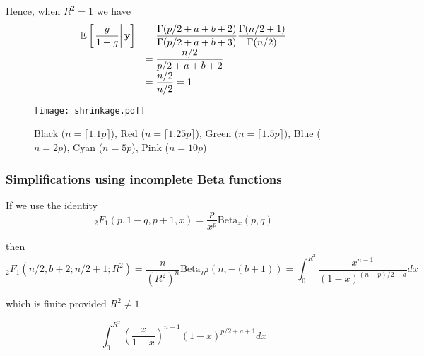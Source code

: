 \documentclass{article}
\def\vectorfontone{\bf}
\def\vy{{\vectorfontone y}}                      %
\def\bE{{\mathbb E}}                             %
\def\ds{\displaystyle}
\theoremstyle{definition}
\begin{document}
\noindent Hence, when $R^2=1$ we have
$$
\begin{array}{rl}
\ds \bE\left[ \left. \frac{g}{1+g}  \right| \vy \right]
& \ds = 
\frac{\Gamma(p/2+a+b+2)}{\Gamma(p/2+a+b+3)}    
\frac{\Gamma(n/2+1)}{\Gamma(n/2)}
\\
& \ds = \frac{ n/2}{p/2+a+b+2}
\\
& \ds = \frac{ n/2}{n/2} = 1
\end{array}
$$


\begin{figure}[ht]
	\centering
	\texttt{[image: shrinkage.pdf]}
	\caption{Black ($n=\lceil 1.1p \rceil$), Red ($n=\lceil 1.25p \rceil$), Green ($n=\lceil 1.5p \rceil$), Blue ($n= 2p$), Cyan ($n= 5p$), Pink ($n= 10p$)}
	\label{fig:04}
\end{figure}



 








\subsubsection{Simplifications using incomplete Beta functions}

If we use the identity
$$
{}_2 F_1(p,1-q,p+1,x) = \frac{p}{x^p}\mbox{Beta}_x(p,q)
$$

\noindent then
$$
{}_2 F_1(n/2,b+2;n/2 + 1;R^2) = \frac{n}{(R^2)^n}\mbox{Beta}_{R^2}(n,-(b+1)) = \int_{0}^{R^2} \frac{ x^{n-1}}{ (1-x)^{(n-p)/2 - a}} dx
$$

\noindent which is finite provided $R^2\ne 1$.


$$
\int_{0}^{R^2} \left( \frac{x}{1-x}\right)^{n-1} (1-x)^{p/2 + a + 1}   dx
$$
\end{document}
